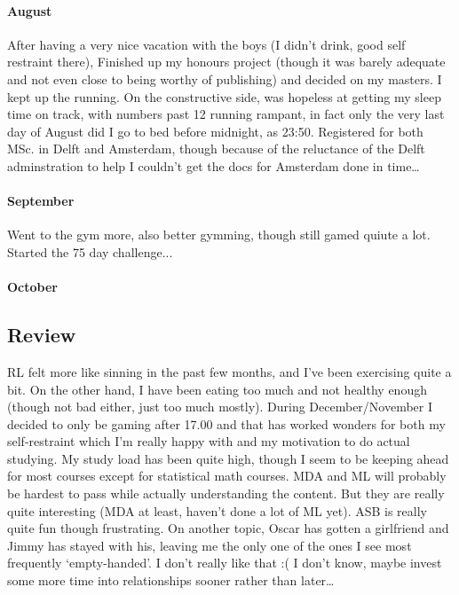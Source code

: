 \documentclass[a4paper]{article}
\begin{document}
\paragraph{August} After having a very nice vacation with the boys (I didn't drink, good self restraint there),
Finished up my honours project (though it was barely adequate and not even close to being worthy of publishing) and decided on my masters.
I kept up the running.
On the constructive side, was hopeless at getting my sleep time on track, with numbers past 12 running rampant, in fact only the very last day of August did I go to bed before midnight, as 23:50.
Registered for both MSc. in Delft and Amsterdam, though because of the reluctance of the Delft adminstration to help I couldn't get the docs for Amsterdam done in time\dots

\paragraph{September}
Went to the gym more, also better gymming, though still gamed quiute a lot.
Started the 75 day challenge...

\paragraph{October}
\subsection{Review}
RL felt more like sinning in the past few months, and I've been exercising quite a bit. On the other hand, I have been eating too much and not healthy enough (though not bad either, just too much mostly). During December/November I decided to only be gaming after 17.00 and that has worked wonders for both my self-restraint which I'm really happy with and my motivation to do actual studying. My study load has been quite high, though I seem to be keeping ahead for most courses except for statistical math courses. MDA and ML will probably be hardest to pass while actually understanding the content.
But they are really quite interesting (MDA at least, haven't done a lot of ML yet). ASB is really quite fun though frustrating.
On another topic, Oscar has gotten a girlfriend and Jimmy has stayed with his, leaving me the only one of the ones I see most frequently `empty-handed'. I don't really like that :( I don't know, maybe invest some more time into relationships sooner rather than later\dots
\end{document}

